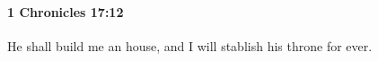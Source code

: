 
		\paragraph{1 Chronicles 17:12} %
			\label{1CHRONICLES-17-12}

			He shall build me an house, and I will stablish his throne for ever.


